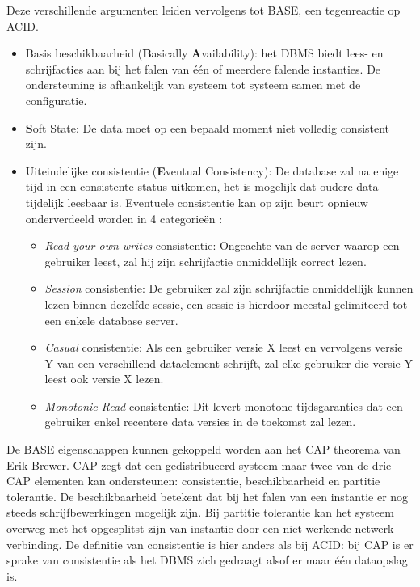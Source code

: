 Deze verschillende argumenten leiden vervolgens tot BASE, een tegenreactie op ACID. \noindent 
\begin{itemize}
 \item Basis beschikbaarheid (\textbf{B}asically \textbf{A}vailability): het DBMS biedt lees- en schrijfacties aan bij het falen van één of meerdere falende instanties. De ondersteuning is afhankelijk van systeem tot systeem samen met de configuratie. 
 \item \textbf{S}oft State: De data moet op een bepaald moment niet volledig consistent zijn. 
 \item Uiteindelijke consistentie (\textbf{E}ventual Consistency): De database zal na enige tijd in een consistente status uitkomen, het is mogelijk dat oudere data tijdelijk leesbaar is. Eventuele consistentie kan op zijn beurt opnieuw onderverdeeld worden in 4 categorieën \cite[slide 16]{lipcon2009design}:
 	\begin{itemize}
 		\item \textit{Read your own writes} consistentie: Ongeachte van de server waarop een gebruiker leest, zal hij zijn schrijfactie onmiddellijk correct lezen. 
 		\item \textit{Session} consistentie: De gebruiker zal zijn schrijfactie onmiddellijk kunnen lezen binnen dezelfde sessie, een sessie is hierdoor meestal gelimiteerd tot een enkele database server. 
 		\item \textit{Casual} consistentie: Als een gebruiker versie X leest en vervolgens versie Y van een verschillend dataelement schrijft, zal elke gebruiker die versie Y leest ook versie X lezen.
 		\item \textit{Monotonic Read} consistentie: Dit levert monotone tijdsgaranties dat een gebruiker enkel recentere data versies in de toekomst zal lezen. 
 	\end{itemize}
\end{itemize}
De BASE eigenschappen kunnen gekoppeld worden aan het CAP theorema van Erik Brewer\cite{Brewer:2000:TRD:343477.343502}. CAP zegt dat een gedistribueerd systeem maar twee van de drie CAP elementen kan ondersteunen: consistentie, beschikbaarheid en partitie tolerantie. De beschikbaarheid betekent dat bij het falen van een instantie er nog steeds schrijfbewerkingen mogelijk zijn. Bij partitie tolerantie kan het systeem overweg met het opgesplitst zijn van instantie door een niet werkende netwerk verbinding. De definitie van consistentie is hier anders als bij ACID: bij CAP is er sprake van consistentie als het DBMS zich gedraagt alsof er maar één dataopslag is.


